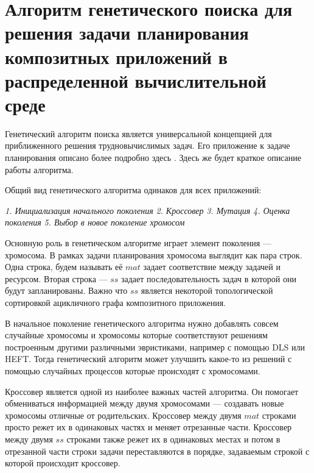 \chapter*{Алгоритм генетического поиска для решения задачи планирования композитных приложений в распределенной вычислительной среде}
\begin{spacing}{1.3}

Генетический алгоритм поиска является универсальной концепцией для приближенного решения трудновычислимых задач. Его приложение к задаче планирования описано более подробно здесь \cite{GA}. Здесь же будет краткое описание работы алгоритма.

Общий вид генетического алгоритма одинаков для всех приложений:

\begin{algorithmic}
\STATE \textit{1. Инициализация начального поколения}
    	\STATE \textit{2. Кроссовер} 
    	\STATE \textit{3. Мутация}
    	\STATE \textit{4. Оценка поколения}
    	\STATE \textit{5. Выбор в новое поколение хромосом}
    \ENDWHILE
\end{algorithmic}

Основную роль в генетическом алгоритме играет элемент поколения --- хромосома. В рамках задачи планирования хромосома выглядит как пара строк. Одна строка, будем называть её $mat$ задает соответствие между задачей и ресурсом. Вторая строка --- $ss$ задает последовательность задач в которой они будут запланированы. Важно что $ss$ является некоторой топологической сортировкой ацикличного графа композитного приложения.

В начальное поколение генетического алгоритма нужно добавлять совсем случайные хромосомы и хромосомы которые соответствуют решениям построенным другими различными эвристиками, например с помощью DLS или HEFT. Тогда генетический алгоритм может улучшить какое-то из решений с помощью случайных процессов которые происходят с хромосомами. 


Кроссовер является одной из наиболее важных частей алгоритма. Он помогает обмениваться информацией между двумя хромосомами --- создавать новые хромосомы отличные от родительских. Кроссовер между двумя $mat$ строками просто режет их в одинаковых частях и меняет отрезанные части. Кроссовер между двумя $ss$ строками также режет их в одинаковых местах и потом в отрезанной части строки задачи переставляются в порядке, задаваемым строкой с которой происходит кроссовер. 


\end{spacing}
